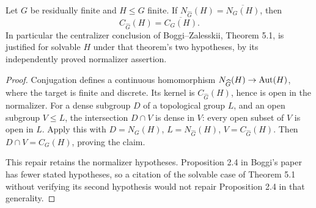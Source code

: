Let \(G\) be residually finite and \(H\leq G\) finite. If
\(N_{\widehat G}(H)=\overline{N_G(H)}\), then
\[
 C_{\widehat G}(H)=\overline{C_G(H)}.
\]
In particular the centralizer conclusion of Boggi--Zalesskii,
Theorem 5.1, is justified for solvable \(H\) under that theorem's two
hypotheses, by its independently proved normalizer assertion.
\begin{proof}
Conjugation defines a continuous homomorphism
\(N_{\widehat G}(H)\to\operatorname{Aut}(H)\), where the target is finite and discrete.
Its kernel is \(C_{\widehat G}(H)\), hence is open in the normalizer.
For a dense subgroup \(D\) of a topological group \(L\), and an open
subgroup \(V\leq L\), the intersection \(D\cap V\) is dense in \(V\):
every open subset of \(V\) is open in \(L\). Apply this with
\(D=N_G(H)\), \(L=N_{\widehat G}(H)\), \(V=C_{\widehat G}(H)\).
Then \(D\cap V=C_G(H)\), proving the claim.

This repair retains the normalizer hypotheses. Proposition 2.4 in
Boggi's paper has fewer stated hypotheses, so a citation of the solvable
case of Theorem 5.1 without verifying its second hypothesis would not
repair Proposition 2.4 in that generality.
\end{proof}

